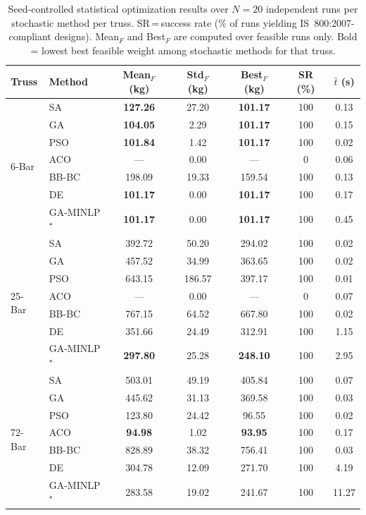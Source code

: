 \documentclass[lineno,pdflatex,sn-mathphys-num]{sn-jnl}
\begin{document}
\begin{table}[tbp]\centering
\caption{Seed-controlled statistical optimization results over $N=20$ independent runs per stochastic method per truss. SR\,=\,success rate (\% of runs yielding IS~800:2007-compliant designs). Mean$_F$ and Best$_F$ are computed over feasible runs only. Bold = lowest best feasible weight among stochastic methods for that truss.}
\label{tab:statistical}
\begin{tabular}{@{}llccccc@{}}
\toprule
\textbf{Truss} & \textbf{Method} & \textbf{Mean}$_F$ (kg) & \textbf{Std}$_F$ (kg) & \textbf{Best}$_F$ (kg) & \textbf{SR} (\%) & $\bar{t}$ (s) \\
\midrule
\multirow{7}{*}{6-Bar} & SA & \textbf{127.26} & 27.20 & \textbf{101.17} & 100 & 0.13 \\
 & GA & \textbf{104.05} & 2.29 & \textbf{101.17} & 100 & 0.15 \\
 & PSO & \textbf{101.84} & 1.42 & \textbf{101.17} & 100 & 0.02 \\
 & ACO & --- & 0.00 & --- & 0 & 0.06 \\
 & BB-BC & 198.09 & 19.33 & 159.54 & 100 & 0.13 \\
 & DE & \textbf{101.17} & 0.00 & \textbf{101.17} & 100 & 0.17 \\
 & GA-MINLP$^\star$ & \textbf{101.17} & 0.00 & \textbf{101.17} & 100 & 0.45 \\
\midrule
\multirow{7}{*}{25-Bar} & SA & 392.72 & 50.20 & 294.02 & 100 & 0.02 \\
 & GA & 457.52 & 34.99 & 363.65 & 100 & 0.02 \\
 & PSO & 643.15 & 186.57 & 397.17 & 100 & 0.01 \\
 & ACO & --- & 0.00 & --- & 0 & 0.07 \\
 & BB-BC & 767.15 & 64.52 & 667.80 & 100 & 0.02 \\
 & DE & 351.66 & 24.49 & 312.91 & 100 & 1.15 \\
 & GA-MINLP$^\star$ & \textbf{297.80} & 25.28 & \textbf{248.10} & 100 & 2.95 \\
\midrule
\multirow{7}{*}{72-Bar} & SA & 503.01 & 49.19 & 405.84 & 100 & 0.07 \\
 & GA & 445.62 & 31.13 & 369.58 & 100 & 0.03 \\
 & PSO & 123.80 & 24.42 & 96.55 & 100 & 0.02 \\
 & ACO & \textbf{94.98} & 1.02 & \textbf{93.95} & 100 & 0.17 \\
 & BB-BC & 828.89 & 38.32 & 756.41 & 100 & 0.03 \\
 & DE & 304.78 & 12.09 & 271.70 & 100 & 4.19 \\
 & GA-MINLP$^\star$ & 283.58 & 19.02 & 241.67 & 100 & 11.27 \\
\bottomrule
\end{tabular}
\end{table}
\end{document}

